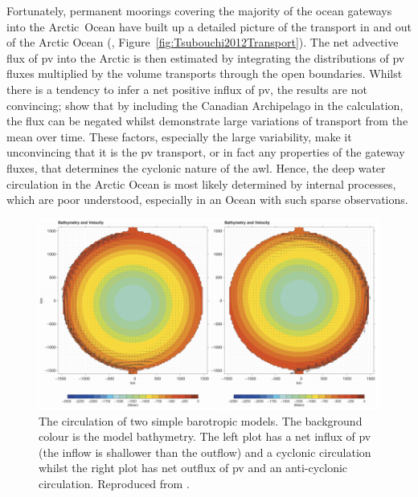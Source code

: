 \documentclass[12pt,a4paper]{report}
\newcommand*\figref[1]{Figure~\ref{#1}}
\begin{document}
Fortunately, permanent moorings 
covering the majority of the ocean gateways into the Arctic~Ocean have built
up a detailed picture of the transport in and out of the Arctic Ocean 
(\cite{tsubouchi2012arctic}, \figref{fig:Tsubouchi2012Transport}). The net 
advective flux of \gls{pv} into the Arctic is then estimated by integrating  the
 distributions of \gls{pv} fluxes multiplied by the volume transports through the 
 open boundaries.
Whilst there is a tendency to infer a net positive influx of \gls{pv}, the
results are not convincing; \cite{munchow2006observational} show that by including the
Canadian Archipelago in the \cite{yang2005arctic} calculation, the flux can be negated
whilst \cite{tsubouchi2012arctic} demonstrate large variations of transport 
from the mean over time. These factors, especially the 
large variability, make it unconvincing that it is the \gls{pv}
 transport, or in fact any properties of the gateway fluxes, that determines the 
cyclonic nature of the \gls{awl}.
Hence, the deep water circulation in the Arctic Ocean is most likely determined by 
internal processes, which are poor understood, especially in an Ocean with such sparse observations.

\begin{figure}
	\centering
	\includegraphics[width=\linewidth]{Yang2005}
	\caption[\cite{yang2005arctic}]{ The circulation of two simple barotropic
		models. The background colour is the model bathymetry. The left plot has
		a net influx of \gls{pv} (the inflow is shallower than the outflow) 
		and a cyclonic circulation whilst the right plot has net outflux of  \gls{pv} 
		and an anti-cyclonic circulation. Reproduced from \cite{yang2005arctic}.}
	\label{fig:Yang2005}
\end{figure}
\end{document}
